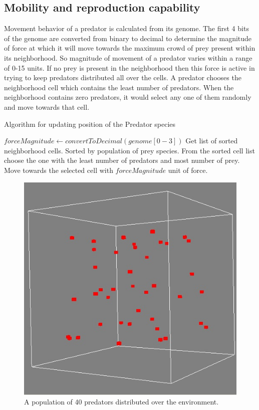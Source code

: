 \subsection{Mobility and reproduction capability}
Movement behavior of a predator is calculated from its genome. The first 4 bits of the genome are converted from binary to decimal to determine the magnitude of force at which it will move towards the maximum crowd of prey present within its neighborhood. So magnitude of movement of a predator varies within a range of 0-15 units. If no prey is present in the neighborhood then this force is active in trying to keep predators distributed all over the cells. A predator chooses the neighborhood cell which contains the least number of predators. When the neighborhood contains zero predators, it would select any one of them randomly and move towards that cell.

\begin{algorithm}[h]
	\caption{Algorithm for updating position of the Predator species}
	\label{algo:algorithm-movement-predator}
	\begin{algorithmic}
			\STATE $forceMagnitude \gets convertToDecimal(genome[0-3])$
			\STATE Get list of sorted neighborhood cells. Sorted by population of prey species.
			\STATE From the sorted cell list choose the one with the least number of predators and most number of prey.
			\STATE Move towards the selected cell with $forceMagnitude$ unit of force.
		\ENDFOR
	\end{algorithmic}
\end{algorithm}

\begin{figure}[h]
	\centering
	\includegraphics[scale=0.60]{images/predators-40}
	\caption[A population of predators]{A population of 40 predators distributed over the environment.}
	\label{fig:predators-40}
\end{figure}

